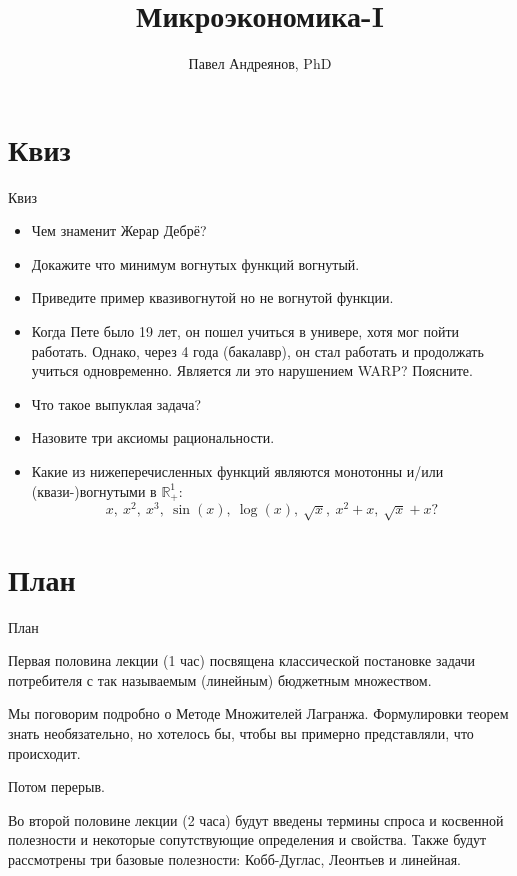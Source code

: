 \documentclass{beamer}
\title{
Микроэкономика-I
}
\author{
Павел Андреянов, PhD
}
\begin{document}
\maketitle

\section{Квиз}

\begin{frame}{Квиз}

\begin{itemize}
  \item Чем знаменит Жерар Дебрё? \pause
  \item Докажите что минимум вогнутых функций вогнутый. \pause
  \item Приведите пример квазивогнутой но не вогнутой функции. \pause
  \item Когда Пете было 19 лет, он пошел учиться в универе, хотя мог пойти работать. Однако, через 4 года (бакалавр), он стал работать и продолжать учиться одновременно. Является ли это нарушением WARP? Поясните.  \pause
  \item Что такое выпуклая задача? \pause
  \item Назовите три аксиомы рациональности. \pause
  \item Какие из нижеперечисленных функций являются монотонны и/или (квази-)вогнутыми в $\mathbb{R}^1_+$: $$x, \ x^2, \ x^3, \ \sin(x), \ \log(x), \ \sqrt{x}, \ x^2 + x, \ \sqrt{x} + x?$$
\end{itemize}

\end{frame}

\section{План}

\begin{frame}{План}

Первая половина лекции (1 час) посвящена классической постановке задачи потребителя с так называемым (линейным) бюджетным множеством.

Мы поговорим подробно о Методе Множителей Лагранжа. Формулировки теорем знать необязательно, но хотелось бы, чтобы вы примерно представляли, что происходит.

Потом перерыв.

Во второй половине лекции (2 часа) будут введены термины спроса и косвенной полезности и некоторые сопутствующие определения и свойства. Также будут рассмотрены три базовые полезности: Кобб-Дуглас, Леонтьев и линейная.

\end{frame}
\end{document}
